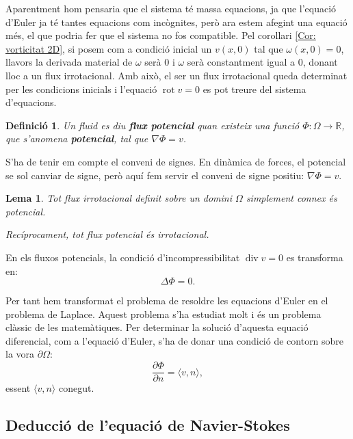 \documentclass{article}
\numberwithin{equation}{section}
\DeclareMathOperator{\diver}{div}
\DeclareMathOperator{\rot}{rot}
\newtheorem{definicio}{Definici\'{o}}[section]
\newtheorem{lema}{Lema}[section]
\begin{document}
Aparentment hom pensaria que el sistema t\'{e} massa equacions, ja que l'equaci\'{o} d'Euler ja t\'{e} tantes equacions com inc\`{o}gnites, per\`{o} ara estem afegint una equaci\'{o} m\'{e}s, el que podria fer que el sistema no fos compatible. Pel corol\textperiodcentered lari \ref{Cor: vorticitat 2D}, si posem com a condici\'{o} inicial un $v(x,0)$ tal que $\omega(x,0)=0$, llavors la derivada material de $\omega$ ser\`{a} $0$ i $\omega$ ser\`{a} constantment igual a $0$, donant lloc a un flux irrotacional. Amb aix\`{o}, el ser un flux irrotacional queda determinat per les condicions inicials i l'equaci\'{o} $\rot v=0$ es pot treure del sistema d'equacions.

\begin{definicio}
Un fluid es diu \textbf{flux potencial} quan existeix una funci\'{o} $\Phi:\Omega\rightarrow\mathbb{R}$, que s'anomena \textbf{potencial}, tal que $\nabla\Phi=v$.
\end{definicio}

S'ha de tenir em compte el conveni de signes. En din\`{a}mica de forces, el potencial se sol canviar de signe, per\`{o} aqu\'{i} fem servir el conveni de signe positiu: $\nabla\Phi=v$.

\begin{lema}
Tot flux irrotacional definit sobre un domini $\Omega$ simplement connex \'{e}s potencial.

Rec\'{i}procament, tot flux potencial \'{e}s irrotacional.
\end{lema}

En els fluxos potencials, la condici\'{o} d'incompressibilitat $\diver v=0$ es transforma en:
\begin{equation}
\Delta\Phi=0.
\end{equation}

Per tant hem transformat el problema de resoldre les equacions d'Euler en el problema de Laplace. Aquest problema s'ha estudiat molt i \'{e}s un problema cl\`{a}ssic de les matem\`{a}tiques. Per determinar la soluci\'{o} d'aquesta equaci\'{o} diferencial, com a l'equaci\'{o} d'Euler, s'ha de donar una condici\'{o} de contorn sobre la vora $\partial\Omega$:
\begin{equation}
\frac{\partial\Phi}{\partial n}=\langle v,n\rangle,
\end{equation}
essent $\langle v,n\rangle$ conegut.

\subsection{Deducci\'{o} de l'equaci\'{o} de Navier-Stokes}
\end{document}
